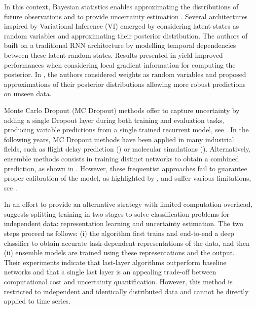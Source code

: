 \documentclass[journal]{IEEEtran}
\begin{document}
In this context, Bayesian statistics enables approximating the distributions of future observations and to provide uncertainty estimation \cite{Hinton1995BayesianLF}.
Several architectures inspired by Variational Inference (VI) emerged by considering latent states as random variables and approximating their posterior distribution.
The authors of \cite{Chung2015NIPS} built on a traditional RNN architecture by modelling temporal dependencies between these latent random states.
Results presented in \cite{Fortunato2017bayesian} yield improved performances when considering local gradient information for computing the posterior.
In \cite{Blundell2015}, the authors considered weights as random variables and proposed approximations of their posterior distributions allowing more robust predictions on unseen data.

Monte Carlo Dropout (MC Dropout) methods offer to capture uncertainty by adding a single  Dropout layer during both training and evaluation tasks, producing variable predictions from a single trained recurrent model, see \cite{Gal2016NIPS}.
In the following years, MC Dropout methods have been applied in many industrial fields, such as flight delay prediction (\cite{Vandal2018}) or molecular simulations (\cite{Wen2020UncertaintyQI}).
Alternatively, ensemble methods consists in training distinct networks to obtain a combined prediction, as shown in \cite{Pearce2018}.
However, these frequentist approaches fail to guarantee proper calibration of the model, as highlighted by \cite{ashukha2020pitfalls}, and suffer various limitations, see \cite{Fong2020}.

In an effort to provide an alternative strategy with limited computation overhead, \cite{Brosse2020OnLA} suggests splitting training in two stages to solve classification problems for independent data: representation learning and uncertainty estimation. The two steps proceed as follows: (i) the algorithm first trains and end-to-end a deep classifier to obtain accurate task-dependent representations of the data, and then (ii) ensemble models are trained using these representations and the output. Their experiments indicate that last-layer algorithms outperform baseline networks and that a single last layer is an appealing trade-off between computational cost and uncertainty quantification. However, this method is restricted to independent and identically distributed data and cannot be directly applied to time series.
\end{document}
